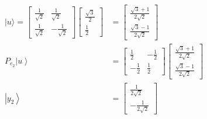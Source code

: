 \documentclass[main.tex]{subfiles}
\begin{document}
\begin{enumerate}
\begin{enumerate}
\begin{align*}
            |u\rangle =
            \left[\begin{array}{cc} \frac{1}{\sqrt{2}} & \frac{1}{\sqrt{2}} 
            \\ \frac{1}{\sqrt{2}} & -\frac{1}{\sqrt{2}} \end{array}\right]
            \left[\begin{array}{c} \frac{\sqrt{3}}{2} 
            \\ \frac{1}{2} \end{array}\right]                                           & = \left[\begin{array}{c} \frac{\sqrt{3}+1}{2 \sqrt{2}} \\ \frac{\sqrt{3}-1}{2 \sqrt{2}} \end{array}\right] \tag{new basis}\\
            P_{e_2} \left|u\right\rangle                                                & = \left[\begin{array}{ll} \frac{1}{2} & -\frac{1}{2} \\ -\frac{1}{2} & \frac{1}{2} \end{array}\right] 
                                                                                        \left[\begin{array}{c} \frac{\sqrt{3}+1}{2 \sqrt{2}} \\ \frac{\sqrt{3}-1}{2 \sqrt{2}} \end{array}\right] \\
            \left|y_{2}\right\rangle                                                    & = \left[\begin{array}{c} \frac{1}{2\sqrt{2}} \\ -\frac{1}{2\sqrt{2}} \end{array}\right]
        \end{align*}
        

\end{enumerate}
\end{enumerate}
\end{document}
